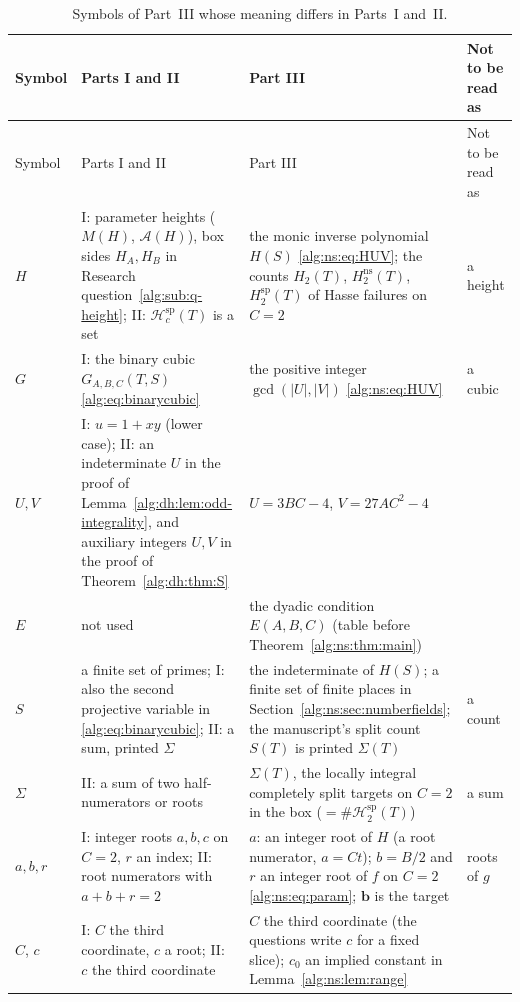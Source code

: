 \documentclass[11pt]{article}
\numberwithin{equation}{section}
\theoremstyle{plain}
\theoremstyle{plain}
\theoremstyle{plain}
\theoremstyle{definition}
\theoremstyle{definition}
\theoremstyle{definition}
\theoremstyle{remark}
\newcommand{\target}{\boldsymbol b}
\newcommand{\Hsplit}{\mathcal H^{\mathrm{sp}}}
\newcommand{\NS}{\mathrm{ns}}\newcommand{\spc}{\mathrm{sp}}
\begin{document}
\begingroup\small
\setlength{\tabcolsep}{4pt}
\begin{longtable}{@{}>{\raggedright}p{}>{\raggedright}p{}>{\raggedright}p{}>{\raggedright\arraybackslash}p{}@{}}
\caption{Symbols of Part~III whose meaning differs in Parts~I and~II.}
\label{alg:ns:tab:notation}\\
\toprule
Symbol & Parts I and II & Part III & Not to be read as\\
\midrule
\endfirsthead
\toprule
Symbol & Parts I and II & Part III & Not to be read as\\
\midrule
\endhead
\bottomrule
\endfoot
$H$ & I: parameter heights ($M(H)$, $\mathcal A(H)$), box sides
$H_A,H_B$ in Research question~\ref{alg:sub:q-height}; II: $\Hsplit_c(T)$
is a set & the monic inverse polynomial $H(S)$ \eqref{alg:ns:eq:HUV};
the counts $H_2(T)$, $H_2^{\NS}(T)$, $H_2^{\spc}(T)$ of Hasse failures on
$C=2$ & a height\\
$G$ & I: the binary cubic $G_{A,B,C}(T,S)$ \eqref{alg:eq:binarycubic} &
the positive integer $\gcd(|U|,|V|)$ \eqref{alg:ns:eq:HUV} & a cubic\\
$U,V$ & I: $u=1+xy$ (lower case); II: an indeterminate $U$ in the proof
of Lemma~\ref{alg:dh:lem:odd-integrality}, and auxiliary integers $U,V$
in the proof of Theorem~\ref{alg:dh:thm:S} & $U=3BC-4$, $V=27AC^2-4$ & \\
$E$ & not used & the dyadic condition $E(A,B,C)$ (table before
Theorem~\ref{alg:ns:thm:main}) & \\
$S$ & a finite set of primes; I: also the second projective variable in
\eqref{alg:eq:binarycubic}; II: a sum, printed $\Sigma$ & the
indeterminate of $H(S)$; a finite set of finite places in
Section~\ref{alg:ns:sec:numberfields}; the manuscript's split count
$S(T)$ is printed $\Sigma(T)$ & a count\\
$\Sigma$ & II: a sum of two half-numerators or roots & $\Sigma(T)$, the
locally integral completely split targets on $C=2$ in the box
($=\#\Hsplit_2(T)$) & a sum\\
$a,b,r$ & I: integer roots $a,b,c$ on $C=2$, $r$ an index; II: root
numerators with $a+b+r=2$ & $a$: an integer root of $H$ (a root
numerator, $a=Ct$); $b=B/2$ and $r$ an integer root of $f$ on $C=2$
\eqref{alg:ns:eq:param}; $\target$ is the target & roots of $g$\\
$C$, $c$ & I: $C$ the third coordinate, $c$ a root; II: $c$ the third
coordinate & $C$ the third coordinate (the questions write $c$ for a
fixed slice); $c_0$ an implied constant in Lemma~\ref{alg:ns:lem:range} &

\end{longtable}
\end{document}
